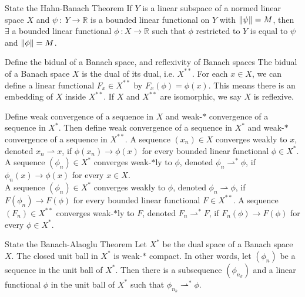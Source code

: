 \documentclass[avery5388,grid,frame]{flashcards}
\def\Rl{\mathbb{R}}
\begin{document}
\begin{flashcard}
    {State the Hahn-Banach Theorem}
    If $Y$ is a linear subspace of a normed linear space $X$ and $\psi\ :\ Y \rightarrow \Rl$ is a bounded linear functional on $Y$ with $\norm{\psi} = M$, then $\exists$ a bounded linear functional $\phi\ : X \rightarrow \Rl$ such that $\phi$ restricted to $Y$ is equal to $\psi$ and $\norm{\phi} = M$.
\end{flashcard}

\begin{flashcard}
    {Define the bidual of a Banach space, and reflexivity of Banach spaces}
    The bidual of a Banach space $X$ is the dual of its dual, i.e. $X^{**}$.  For each $x \in X$, we can define a linear functional $F_x \in X^{**}$ by $F_x(\phi) = \phi(x)$.  This means there is an embedding of $X$ inside $X^{**}$.  If $X$ and $X^{**}$ are isomorphic, we say $X$ is reflexive.
\end{flashcard}

\begin{flashcard}
    {Define weak convergence of a sequence in $X$ and weak-$*$ convergence of a sequence in $X^*$.  Then define weak convergence of a sequence in $X^*$ and weak-$*$ convergence of a sequence in $X^{**}$.}
    A sequence $(x_n) \in X$ converges weakly to $x$, denoted $x_n \rightharpoonup x$, if $\phi(x_n) \rightarrow \phi(x)$ for every bounded linear functional $\phi \in X^*$.  A sequence $(\phi_n) \in X^*$ converges weak-$*$ly to $\phi$, denoted $\phi_n \rightharpoonup^* \phi$, if $\phi_n(x) \rightarrow \phi(x)$ for every $x \in X$. \\

    A sequence $(\phi_n) \in X^*$ converges weakly to $\phi$, denoted $\phi_n \rightharpoonup \phi$, if $F(\phi_n) \rightarrow F(\phi)$ for every bounded linear functional $F \in X^{**}$.  A sequence $(F_n) \in X^{**}$ converges weak-$*$ly to $F$, denoted $F_n \rightharpoonup^* F$, if $F_n(\phi) \rightarrow F(\phi)$ for every $\phi \in X^*$.
\end{flashcard}

\begin{flashcard}
    {State the Banach-Alaoglu Theorem}
    Let $X^*$ be the dual space of a Banach space $X$.  The closed unit ball in $X^*$ is weak-$*$ compact.  In other words, let $(\phi_n)$ be a sequence in the unit ball of $X^*$.  Then there is a subsequence $(\phi_{n_k})$ and a linear functional $\phi$ in the unit ball of $X^*$ such that $\phi_{n_k} \rightharpoonup^* \phi$.
\end{flashcard}
\end{document}
